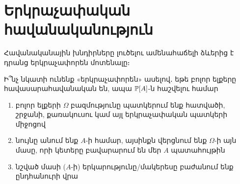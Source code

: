 

\section{Երկրաչափական հավանականություն}

Հավանականային խնդիրները լուծելու ամենահաճելի ձևերից է դրանց երկրաչափորեն մոտենալը։

\begin{figure}[h]
\centering
{}
\end{figure}

Ի՞նչ նկատի ունենք «երկրաչափորեն» ասելով․ եթե բոլոր ելքերը հավասարահավանական են, ապա $\mathbb{P}[A]$-ն հաշվելու համար
\begin{enumerate}
    \item բոլոր ելքերի $\Omega$ բազմությունը պատկերում ենք հատվածի, շրջանի, քառակուսու կամ այլ երկրաչափական պատկերի միջոցով
    \item նույնը անում ենք $A$-ի համար, այսինքն վերցնում ենք $\Omega$-ի այն մասը, որի կետերը բավարարում են մեր $A$ պատահույթին
    \item նշված մասի ($A$-ի) երկարությունը/մակերեսը բաժանում ենք ընդ\-հանուրի վրա
\end{enumerate}

